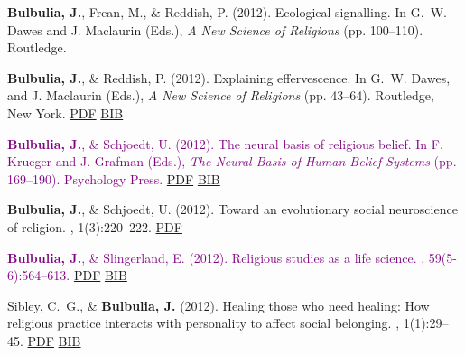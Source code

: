 \documentclass{article}
\begin{document}
\begin{thebibliography}{99}
{\bf Bulbulia, J.}, Frean, M., \& Reddish, P. (2012).
\newblock Ecological signalling.
\newblock In G.~W. Dawes and J. Maclaurin (Eds.), {\em A New Science of
  Religions} (pp. 100--110). Routledge. %


{\bf Bulbulia, J.}, \& Reddish, P. (2012).
\newblock Explaining effervescence.
\newblock In G.~W. Dawes, and J. Maclaurin (Eds.), {\em A New Science of Religions}
  (pp. 43--64). Routledge, New York. \href{https://www.dropbox.com/s/t67m0qyptuec2ix/BUL_Chap6-ExplEffe-PROOF.pdf?dl=0}{PDF} \href{https://www.dropbox.com/s/23rouucf6vs7igi/2012.explainEfferv.bul.bib?dl=0}{BIB}


\textcolor{Purple}{
{\bf Bulbulia, J.}, \& Schjoedt, U. (2012).
\newblock The neural basis of religious belief.
\newblock In F. Krueger and J. Grafman (Eds.), {\em The Neural Basis of
  Human Belief Systems} (pp. 169--190). Psychology Press. }\href{https://www.dropbox.com/s/lsatbexn9jasbfh/NB09.pdf?dl=0}{PDF} \href{https://www.dropbox.com/s/m4jmcqzi9i3dmj8/2013.Bulbulia.Schoedt.Neural.Belief.bib?dl=0}{BIB}


{\bf Bulbulia, J.}, \& Schjoedt, U. (2012).
\newblock Toward an evolutionary social neuroscience of religion.
, 1(3):220--222. \href{https://www.dropbox.com/s/v59etaychbt2z25/2012.bulbulia.schoedt.towardsevoneuroscince.pdf?dl=0}{PDF}


\textcolor{Purple}{
{\bf Bulbulia, J.}, \& Slingerland, E. (2012).
\newblock Religious studies as a life science.
, 59(5-6):564--613.} \href{https://www.dropbox.com/s/eom9r3jbt1qvg4a/NU_059_05-06_564-613.pdf}{PDF} \href{https://www.dropbox.com/s/y8o9w2bvnwjimxk/2012.Bulbulia.Slingerland.Ritual.bib?dl=0}{BIB}


Sibley, C.~G., \& {\bf Bulbulia, J.} (2012).
\newblock Healing those who need healing: How religious practice interacts with
  personality to affect social belonging.
, 1(1):29--45. \href{https://www.equinoxpub.com/journals/index.php/JCSR/article/viewArticle/Healing-Those-Who-Need-Healing}{PDF} \href{https://www.dropbox.com/s/nbd18kv59i1s98a/healing.those.bib?dl=0}{BIB}



\end{thebibliography}
\end{document}
